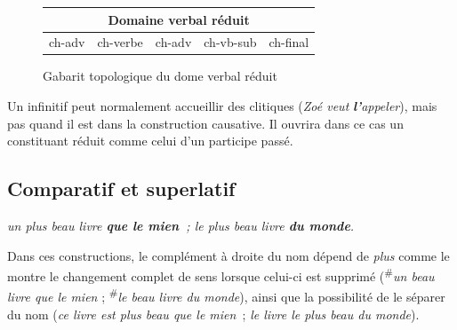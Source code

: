 \begin{figure}
\caption{\label{tab:}Gabarit topologique du dome verbal réduit}
\def\arraystretch{1.5}
\setlength{\tabcolsep}{3ex}
\begin{tabular}{|c|c|c|c|c|}
\hline
\multicolumn{5}{|c|}{\cellcolor{lsDOIGray}Domaine verbal réduit}\\
\hline
ch-adv & \cellcolor{lsDOIGray}ch-verbe & ch-adv & ch-vb-sub & ch-final\\
\hline
\end{tabular}
\end{figure}

Un infinitif peut normalement accueillir des clitiques (\textit{Zoé veut} \textbf{\textit{l’}}\textit{appeler}), mais pas quand il est dans la construction causative. Il ouvrira dans ce cas un constituant réduit comme celui d’un participe passé.

\subsection{Comparatif et superlatif}

\ea
\ea \itshape un plus beau livre \textbf{que le mien~};
\ex \itshape le plus beau livre \textbf{du monde}.
\z
\z

Dans ces constructions, le complément à droite du nom dépend de \textit{plus} comme le montre le changement complet de sens lorsque celui-ci est supprimé (\textsuperscript{\#}\textit{un beau livre que le mien} ; \textsuperscript{\#}\textit{le beau livre du monde}), ainsi que la possibilité de le séparer du nom (\textit{ce livre est plus beau que le mien~}; \textit{le livre le plus beau du monde}).

\begin{figure}
\caption{\label{fig:}}
\end{figure}

